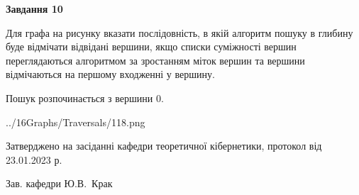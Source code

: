 \documentclass[12pt, ukrainian]{article}
\begin{document}
{\begin {large}
{\begin {center}\textbf{Завдання 10}\end {center}}\par
Для графа на рисунку вказати послідовність, в якій алгоритм пошуку в глибину буде відмічати відвідані вершини, якщо списки суміжності вершин переглядаються алгоритмом за зростанням міток вершин та вершини відмічаються на першому вход\-женні у вершину.\par
Пошук розпочинається з вершини 0.\par

\begin{center}
	{../16Graphs/Traversals/118.png}
\end{center}\par
\newpage


\end {large}
}
{\smallskip \begin {small} Затверджено на засіданні кафедри теоретичної кібернетики, протокол  від   23.01.2023 р.\par\smallskip\smallskip
{\parbox {6.5 cm}{Зав. кафедри \dotfill Ю.В.~Крак}} \end{small}}
\end{document}
